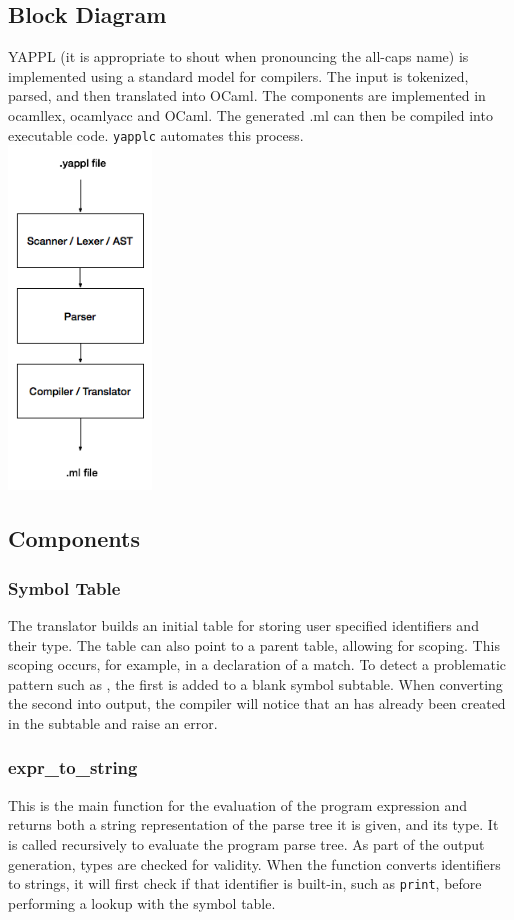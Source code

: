 \subsection{Block Diagram}

YAPPL (it is appropriate to shout when pronouncing the all-caps name) is implemented using a standard model for compilers. The input is tokenized, parsed, and then translated into OCaml. The components are implemented in ocamllex, ocamlyacc and OCaml. The generated .ml can then be compiled into executable code.  \texttt{yapplc} automates this process.\\
\includegraphics[width=1.5in]{block-diagram.png}

\subsection{Components}
\subsubsection{Symbol Table}
The translator builds an initial table for storing user specified identifiers and their type. The table can also point to a parent table, allowing for scoping. This scoping occurs, for example, in a declaration of a \term{(}  \term{::}  \term{)} match. To detect a problematic pattern such as  , the first  is added to a blank symbol subtable. When converting the second  into output, the compiler will notice that an  has already been created in the subtable and raise an error. 
\subsubsection{expr\_to\_string} 
This is the main function for the evaluation of the program expression and returns both a string representation of the parse tree it is given, and its type. It is called recursively to evaluate the program parse tree. As part of the output generation, types are checked for validity. When the function converts identifiers to strings, it will first check if that identifier is built-in, such as \texttt{print}, before performing a lookup with the symbol table.
